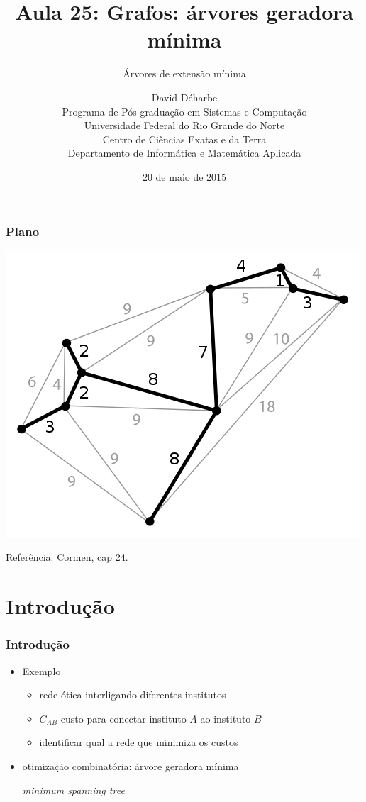 \documentclass{beamer}
\title{Aula 25: Grafos: árvores geradora mínima}
\subtitle{Árvores de extensão mínima}
\author{David Déharbe \\
  Programa de Pós-graduação em Sistemas e Computação \\
  Universidade Federal do Rio Grande do Norte \\
  Centro de Ciências Exatas e da Terra \\
  Departamento de Informática e Matemática Aplicada}
\date{20 de maio de 2015}
\begin{document}

\begin{frame}
  \titlepage
\end{frame}

\begin{frame}
  \frametitle{Plano}
\begin{center}
\includegraphics[height=.5\textheight]{fig/minimum_spanning_tree.png}
\end{center}
  \tableofcontents
Referência: Cormen, cap 24.
\end{frame}

\section{Introdução}

\begin{frame}
\frametitle{Introdução}

\begin{itemize}
\item Exemplo
\begin{itemize}
\item rede ótica interligando diferentes institutos
\item $C_{AB}$ custo para conectar instituto $A$ ao instituto $B$
\item identificar qual a rede que minimiza os custos
\end{itemize}
\item \alert{otimização combinatória}: árvore geradora mínima 

\textit{minimum spanning tree}
\end{itemize}

\end{frame}
\end{document}
